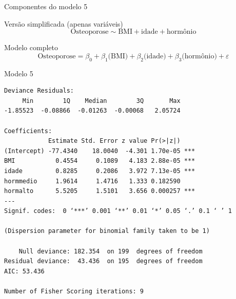 \documentclass{beamer}
\begin{document}
\begin{frame}{\scriptsize Componentes do modelo 5}
  \begin{block}{\footnotesize Versão simplificada (apenas variáveis)}
    \footnotesize
    \begin{displaymath}
      \text{Osteoporose} \sim \text{BMI} + \text{idade} + \text{hormônio}
    \end{displaymath}
  \end{block}
  \bigskip
  \bigskip
  \begin{block}{Modelo completo}
    \footnotesize
    \begin{displaymath}
      \text{Osteoporose} =\beta_0 + \beta_1 \text{(BMI)} + \beta_2 \text{(idade)} + \beta_3 \text{(hormônio)} +\varepsilon
    \end{displaymath}
  \end{block}
  \vfill
\end{frame}

\begin{frame}[fragile]{\scriptsize }
  \begin{center}
    \begin{exampleblock}{Modelo 5}
      \tiny
\begin{verbatim}
Deviance Residuals: 
     Min        1Q    Median        3Q       Max  
-1.85523  -0.08866  -0.01263  -0.00068   2.05724  

Coefficients:
            Estimate Std. Error z value Pr(>|z|)    
(Intercept) -77.4340    18.0040  -4.301 1.70e-05 ***
BMI           0.4554     0.1089   4.183 2.88e-05 ***
idade         0.8285     0.2086   3.972 7.13e-05 ***
hormmedio     1.9614     1.4716   1.333 0.182590    
hormalto      5.5205     1.5101   3.656 0.000257 ***
---
Signif. codes:  0 ‘***’ 0.001 ‘**’ 0.01 ‘*’ 0.05 ‘.’ 0.1 ‘ ’ 1

(Dispersion parameter for binomial family taken to be 1)

    Null deviance: 182.354  on 199  degrees of freedom
Residual deviance:  43.436  on 195  degrees of freedom
AIC: 53.436

Number of Fisher Scoring iterations: 9
\end{verbatim}
    \end{exampleblock}
  \end{center}
\end{frame}
\end{document}
